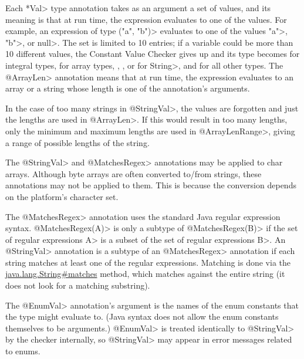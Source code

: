 Each \<*Val> type annotation takes as an argument a set of values, and its
meaning is that at run time, the expression evaluates to one of the values.  For
example, an expression of type
\<("a", "b")> evaluates to
one of the values \<"a">, \<"b">, or \<null>.
The set is limited to 10 entries; if a variable
could be more than 10 different values, the Constant Value
Checker gives up and its type becomes
 for integral types,
 for array types,
,
, or
 for \<String>, and
 for all other types.
The \<@ArrayLen> annotation means that at run time, the expression
evaluates to an array or a string whose length is one of the annotation's arguments.

In the case of too many strings in \<@StringVal>, the values are forgotten
and just the lengths are used in \<@ArrayLen>.
If this would result in too many lengths,
only the minimum and maximum lengths are used in \<@ArrayLenRange>,
giving a range of possible lengths of the string.

The \<@StringVal> and \<@MatchesRegex> annotations may be applied to char arrays.  Although byte
arrays are often converted to/from strings, these annotations may
not be applied to them.  This is because the conversion depends on the
platform's character set.

The \<@MatchesRegex> annotation uses the standard Java regular expression syntax.
\<@MatchesRegex(A)> is only a subtype of \<@MatchesRegex(B)> if the set of regular
expressions \<A> is a subset of the set of regular expressions \<B>. An
\<@StringVal> annotation is a subtype of an \<@MatchesRegex> annotation if
each string matches at least one of the regular expressions.  Matching is done
via the
\href{https://docs.oracle.com/javase/8/docs/api/java/lang/String.html\#matches-java.lang.String-}{java.lang.String\#matches}
method, which matches against the entire string (it does not look for a
matching substring).

The \<@EnumVal> annotation's argument is the names of the enum constants
that the type might evaluate to.  (Java syntax does not allow the enum
constants themselves to be arguments.)  \<@EnumVal>
is treated identically to \<@StringVal> by the checker internally, so
\<@StringVal> may appear in error messages related to enums.


